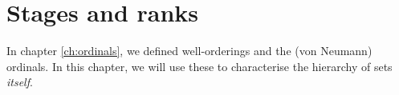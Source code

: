 \documentclass[../../../include/open-logic-chapter]{subfiles}
\begin{document}
\chapter{Stages and ranks}\label{ch:spine}

In chapter \ref{ch:ordinals}, we defined well-orderings and the (von Neumann) ordinals. In this chapter, we will use these to characterise the hierarchy of sets \emph{itself}. 


\OLEndChapterHook
\end{document}
